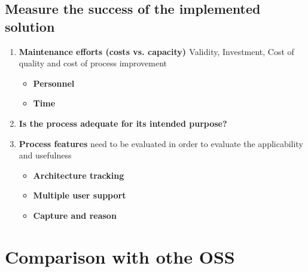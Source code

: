 \subsection{Measure the success of the implemented solution}
\begin{enumerate}
\item \textbf{Maintenance efforts (costs vs. capacity) \cite{Shahin2014}} 
Validity, Investment, Cost of quality and cost of process improvement \cite{Gorschek2006}
\begin{itemize}
\item \textbf{Personnel}
\item \textbf{Time}
\end{itemize}
\item \textbf{Is the process adequate for its intended purpose?}
\item \textbf{Process features}
 need to be evaluated in order to evaluate the applicability and usefulness \cite{Fuggeffa1988}
\begin{itemize}
\item \textbf{Architecture tracking}
\item \textbf{Multiple user support}
\item \textbf{Capture and reason}
\end{itemize}
\end{enumerate}

\section{Comparison with othe OSS}
